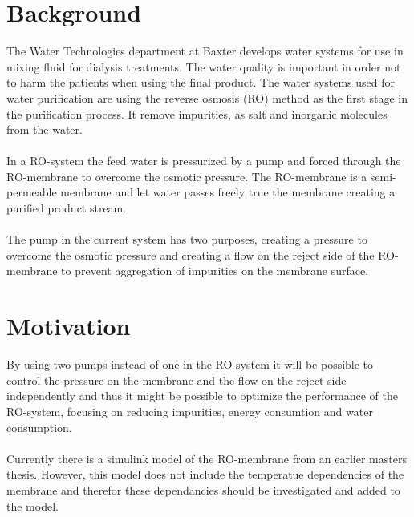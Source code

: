 
\section{Background}

The Water Technologies department at Baxter develops water systems for use in mixing fluid for dialysis treatments. The water quality is important in order not to harm the patients when using the final product. The water systems used for water purification are using the reverse osmosis (RO) method as the first stage in the purification process. It remove impurities, as salt and inorganic molecules from the water\cite{Dow}.\\
\\
In a RO-system the feed water is pressurized by a pump and forced through the RO-membrane to overcome the osmotic pressure. The RO-membrane is a semi-permeable membrane and let water passes freely true the membrane creating a purified product stream. \\
\\
The pump in the current system has two purposes, creating a pressure to overcome the osmotic pressure and creating a flow on the reject side of the RO-membrane to prevent aggregation of impurities on the membrane surface.\\


\section{Motivation}
By using two pumps instead of one in the RO-system it will be possible to control the pressure on the membrane and the flow on the reject side independently and thus it might be possible to optimize the performance of the RO-system, focusing on reducing impurities, energy consumtion and water consumption. \\
\\
Currently there is a simulink model of the RO-membrane from an earlier masters thesis. However, this model does not include the temperatue dependencies of the membrane and therefor these dependancies should be investigated and added to the model. 
